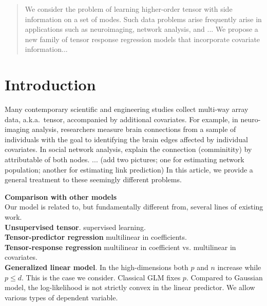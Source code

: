 \documentclass[twoside]{article}
\theoremstyle{plain}
\theoremstyle{definition}
\begin{document}
%

%


\begin{abstract}
We consider the problem of learning higher-order tensor with side information on a set of modes. Such data problems arise frequently arise in applications such as neuroimaging, network analysis, and ... We propose a new family of tensor response regression models that incorporate covariate information...
\end{abstract}

\section{Introduction}

Many contemporary scientific and engineering studies collect multi-way array data, a.k.a.\ tensor, accompanied by additional covariates. For example, in neuro-imaging analysis, researchers measure brain connections from a sample of individuals with the goal to identifying the brain edges affected by individual covariates. In social network analysis, explain the connection (comminitity) by attributable of both nodes. ... 
(add two pictures; one for estimating network population; another for estimating link prediction)
In this article, we provide a general treatment to these seemingly different problems.

{\bf Comparison with other models}\\
Our model is related to, but fundamentally different from, several lines of existing work.\\
{\bf Unsupervised tensor}. supervised learning. \\
{\bf Tensor-predictor regression} multilinear in coefficients. \\
{\bf Tensor-response regression} multilinear in coefficient vs. multilinear in covariates. \\
{\bf Generalized linear model}. In the high-dimensions both $p$ and $n$ increase while $p \leq d$. This is the case we consider. Classical GLM fixes $p$. Compared to Gaussian model, the log-likelihood is not strictly convex in the linear predictor. We allow various types of dependent variable. 
\end{document}
